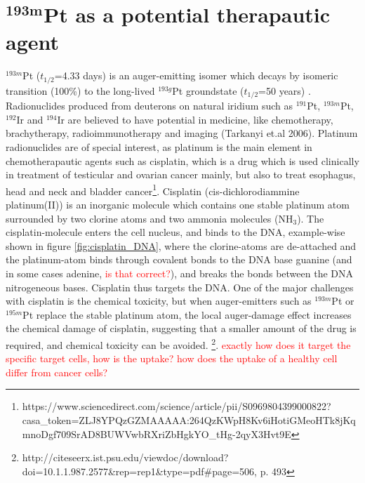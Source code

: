 \documentclass[a4paper,11pt,twoside]{book}
\begin{document}







\section{$\mathbf{^{193m}}$Pt as a potential therapautic agent}
$^{193m}$Pt ($t_{1/2}$=4.33 days) is an auger-emitting isomer which decays by isomeric transition (100\%) to the long-lived $^{193g}$Pt groundstate ($t_{1/2}$=50 years) \cite{ShamsuzzohaBasunia2017a}. Radionuclides produced from deuterons on natural iridium such as $^{191}$Pt, $^{193m}$Pt, $^{192}$Ir and $^{194}$Ir are believed to have potential in medicine, like chemotherapy, brachytherapy, radioimmunotherapy and imaging (Tarkanyi et.al 2006). Platinum radionuclides are of special interest, as platinum is the main element in chemotherapautic agents such as cisplatin, which is a drug which is used clinically in treatment of testicular and ovarian cancer mainly, but also to treat esophagus, head and neck and bladder cancer\footnote{https://www.sciencedirect.com/science/article/pii/S0969804399000822?casa_token=ZLJ8YPQzGZMAAAAA:264QzKWpH8Kv6iHotiGMeoHTk8jKqmnoDgf709SrAD8BUWVwbRXriZbHgkYO_tHg-2qyX3Hvt9E}. Cisplatin  (cis-dichlorodiammine platinum(II)) is an inorganic molecule which contains one stable platinum atom surrounded by two clorine atoms and two ammonia molecules (NH$_3$). The cisplatin-molecule enters the cell nucleus, and binds to the DNA, example-wise shown in figure \ref{fig:cisplatin_DNA}, where the clorine-atoms are de-attached and the platinum-atom binds through covalent bonds to the DNA base guanine (and in some cases adenine, \textcolor{red}{is that correct?}), and breaks the bonds between the DNA nitrogeneous bases. Cisplatin thus targets the DNA. One of the major challenges with cisplatin is the chemical toxicity, but when auger-emitters such as $^{193m}$Pt or $^{195m}$Pt replace the stable platinum atom, the local auger-damage effect increases the chemical damage of cisplatin, suggesting that a smaller amount of the drug is required, and chemical toxicity can be avoided. \footnote{http://citeseerx.ist.psu.edu/viewdoc/download?doi=10.1.1.987.2577&rep=rep1&type=pdf#page=506, p. 493}.  \textcolor{red}{exactly how does it target the specific target cells, how is the uptake? how does the uptake of a healthy cell differ from cancer cells?}
\end{document}
